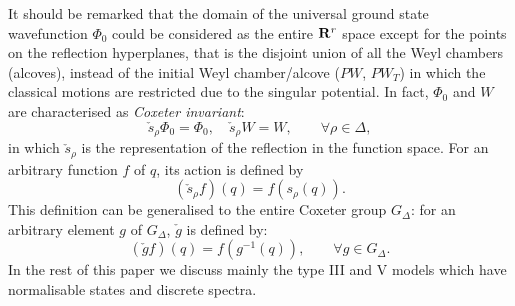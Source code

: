 \documentclass[a4paper,12pt]{article}
\begin{document}
It should be remarked that the domain of the universal
ground state wavefunction
\(\Phi_0\) could be considered as the  entire \({\bf R}^r\) space
except for the points on the reflection hyperplanes,
that is the disjoint union of all the Weyl chambers (alcoves),
instead of
the initial Weyl  chamber/alcove (\(PW\), \(PW_T\)) in which the
classical motions  are restricted due to the singular potential. In
fact,
\(\Phi_0\) and \(W\) are characterised as {\em Coxeter invariant\/}:
\begin{equation}
   \check{s}_{\rho}\Phi_0=\Phi_0,\quad \check{s}_{\rho}W
   =W,\qquad \forall\rho\in\Delta,
   \label{Coxinv}
\end{equation}
in which   \(\check{s}_{\rho}\) is the representation of the reflection
in the function space. For an arbitrary function \(f\) of \(q\),
its action is defined by
\begin{equation}
   (\check{s}_{\rho}f)(q)=f(s_{\rho}(q)).
   \label{defcheck}
\end{equation}
This definition can be generalised to the entire Coxeter group
\(G_{\Delta}\):
for an arbitrary element \(g\) of \(G_{\Delta}\), \(\check{g}\) is defined
by:
\begin{equation}
   (\check{g}f)(q)=f(g^{-1}(q)),\qquad \forall g\in G_{\Delta}.
\end{equation}
In the rest of this paper we discuss mainly  the type III and V models
 which have  normalisable states
and discrete spectra.
\end{document}
